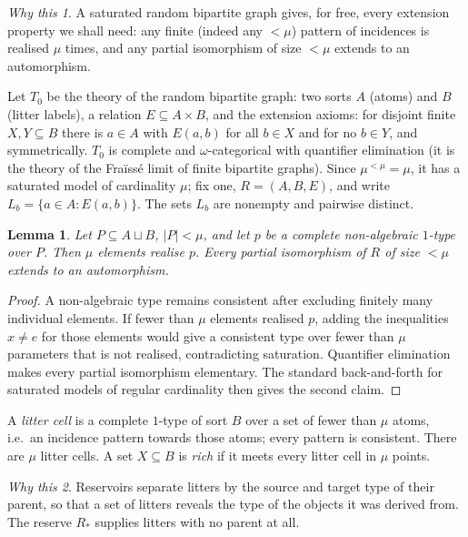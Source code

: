 \documentclass[11pt]{article}
\newtheorem{lemma}[theorem]{Lemma}
\theoremstyle{definition}
\theoremstyle{remark}
\newtheorem*{idea}{Why this}
\begin{document}
\begin{idea}
A saturated random bipartite graph gives, for free, every extension
property we shall need: any finite (indeed any \(<\mu\)) pattern of
incidences is realised \(\mu\) times, and any partial isomorphism of size
\(<\mu\) extends to an automorphism.
\end{idea}

Let \(T_0\) be the theory of the random bipartite graph: two sorts
\(A\) (atoms) and \(B\) (litter labels), a relation \(E\subseteq A\times
B\), and the extension axioms: for disjoint finite \(X,Y\subseteq B\) there
is \(a\in A\) with \(E(a,b)\) for all \(b\in X\) and for no \(b\in Y\), and
symmetrically. \(T_0\) is complete and \(\omega\)-categorical with
quantifier elimination (it is the theory of the Fra\"iss\'e limit of finite
bipartite graphs). Since \(\mu^{<\mu}=\mu\), it has a saturated model of
cardinality \(\mu\); fix one, \(R=(A,B,E)\), and write
\(L_b=\{a\in A:E(a,b)\}\). The sets \(L_b\) are nonempty and pairwise
distinct.

\begin{lemma}\label{lem:saturation}
Let \(P\subseteq A\sqcup B\), \(|P|<\mu\), and let \(p\) be a complete
non-algebraic \(1\)-type over \(P\). Then \(\mu\) elements
realise \(p\). Every partial isomorphism of \(R\) of size \(<\mu\) extends
to an automorphism.
\end{lemma}
\begin{proof}
A non-algebraic type remains consistent after excluding finitely many
individual elements. If fewer than \(\mu\) elements realised \(p\),
adding the inequalities
\(x\neq e\) for those elements would give a consistent type over fewer
than \(\mu\) parameters that is not realised, contradicting saturation.
Quantifier elimination makes every partial isomorphism elementary.
The standard back-and-forth for saturated models of regular cardinality
then gives the second claim.
\end{proof}

A \emph{litter cell} is a complete \(1\)-type of sort \(B\) over a set of
fewer than \(\mu\) atoms, i.e.\ an incidence pattern towards those atoms;
every pattern is consistent. There are \(\mu\) litter cells. A set
\(X\subseteq B\) is \emph{rich} if it meets every litter cell in \(\mu\)
points.

\begin{idea}
Reservoirs separate litters by the source and target type of their parent,
so that a set of litters reveals the type of the objects it was derived
from. The reserve \(R_*\) supplies litters with no parent at all.
\end{idea}
\end{document}
